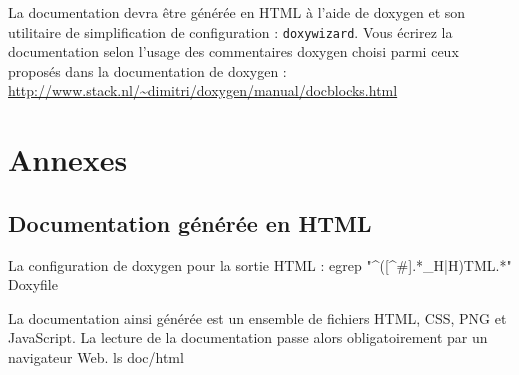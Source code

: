 \documentclass[12pt,a4paper,oneside,titlepage,final]{article}
\begin{document}

La documentation devra être générée en HTML à l'aide de \gls{doxygen}
et son utilitaire de simplification de configuration :
\lstinline{doxywizard}\cite{doxywizard}. Vous écrirez la documentation
selon l'usage des commentaires \gls{doxygen} choisi parmi ceux
proposés dans la documentation de \gls{doxygen} :
\url{http://www.stack.nl/~dimitri/doxygen/manual/docblocks.html}



\newpage
\appendix
\section{Annexes}
\subsection{Documentation générée en HTML}
\label{annexe:htmlOutputDoc}
La configuration de \gls{doxygen} pour la sortie HTML :
\bash[stdout]
egrep "^([^#].*_H|H)TML.*" Doxyfile
\END

La documentation ainsi générée est un ensemble de fichiers HTML, CSS, PNG et
JavaScript. La lecture de la documentation passe alors obligatoirement
par un navigateur Web.
\bash[stdout]
ls doc/html
\END

\end{document}

